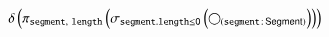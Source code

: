 \documentclass[varwidth=100cm,convert={density=120}]{standalone}
\begin{document}
\begin{preview}
$\duplicateelimination \left(\projection{\var{segment},~\var{length}} \left(\selection{\var{segment.length} \leq \literal{0}} \left(\getvertices{segment}{Segment}\right)\right)\right)$
\end{preview}
\end{document}
